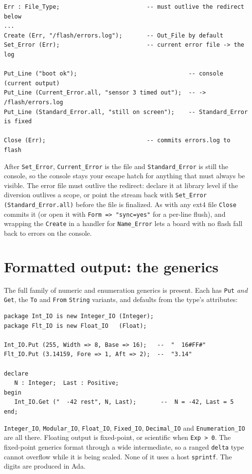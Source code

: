 \begin{lstlisting}
Err : File_Type;                         -- must outlive the redirect below
...
Create (Err, "/flash/errors.log");       -- Out_File by default
Set_Error (Err);                         -- current error file -> the log

Put_Line ("boot ok");                                -- console (current output)
Put_Line (Current_Error.all, "sensor 3 timed out");  -- -> /flash/errors.log
Put_Line (Standard_Error.all, "still on screen");    -- Standard_Error is fixed

Close (Err);                             -- commits errors.log to flash
\end{lstlisting}

After \texttt{Set\_Error}, \texttt{Current\_Error} is the file and
\texttt{Standard\_Error} is still the console, so the console stays your escape
hatch for anything that must always be visible. The error file must outlive the
redirect: declare it at library level if the diversion outlives a scope, or point
the stream back with \texttt{Set\_Error (Standard\_Error.all)} before the file is
finalized. As with any ext4 file \texttt{Close} commits it (or open it with
\texttt{Form => "sync=yes"} for a per-line flush), and wrapping the
\texttt{Create} in a handler for \texttt{Name\_Error} lets a board with no flash
fall back to errors on the console.

\section{Formatted output: the generics}

The full family of numeric and enumeration generics is present. Each has
\texttt{Put} \emph{and} \texttt{Get}, the \texttt{To} and \texttt{From}
\texttt{String} variants, and defaults from the type's attributes:

\begin{lstlisting}
package Int_IO is new Integer_IO (Integer);
package Flt_IO is new Float_IO   (Float);

Int_IO.Put (255, Width => 8, Base => 16);   --  "  16#FF#"
Flt_IO.Put (3.14159, Fore => 1, Aft => 2);  --  "3.14"

declare
   N : Integer;  Last : Positive;
begin
   Int_IO.Get ("  -42 rest", N, Last);       --  N = -42, Last = 5
end;
\end{lstlisting}

\texttt{Integer\_IO}, \texttt{Modular\_IO}, \texttt{Float\_IO}, \texttt{Fixed\_IO},
\texttt{Decimal\_IO} and \texttt{Enumeration\_IO} are all there. Floating output is
fixed-point, or scientific when \texttt{Exp > 0}. The fixed-point generics format
through a wide intermediate, so a ranged \texttt{delta} type cannot overflow while
it is being scaled. None of it uses a host \texttt{sprintf}. The digits are
produced in Ada.

